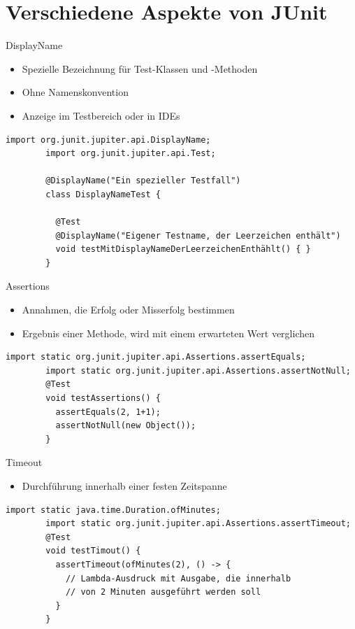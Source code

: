 \documentclass[utf8,t,aspectratio=169]{beamer}
\begin{document}
  \section{Verschiedene Aspekte von JUnit}
    \begin{frame}[fragile]{DisplayName}
      \begin{itemize}
        \item Spezielle Bezeichnung für Test-Klassen und -Methoden
        \item Ohne Namenskonvention
        \item Anzeige im Testbereich oder in IDEs
      \end{itemize}
      \begin{lstlisting}[gobble=8]
        import org.junit.jupiter.api.DisplayName;
        import org.junit.jupiter.api.Test;

        @DisplayName("Ein spezieller Testfall")
        class DisplayNameTest {

          @Test
          @DisplayName("Eigener Testname, der Leerzeichen enthält")
          void testMitDisplayNameDerLeerzeichenEnthählt() { }
        }
      \end{lstlisting}
    \end{frame}
    \begin{frame}[fragile]{Assertions}
      \begin{itemize}
        \item Annahmen, die Erfolg oder Misserfolg bestimmen
          \item Ergebnis einer Methode, wird mit einem erwarteten Wert
            verglichen
      \end{itemize}
      \begin{lstlisting}[gobble=8]
        import static org.junit.jupiter.api.Assertions.assertEquals;
        import static org.junit.jupiter.api.Assertions.assertNotNull;
        @Test
        void testAssertions() {
          assertEquals(2, 1+1);
          assertNotNull(new Object());
        }
      \end{lstlisting}
    \end{frame}
    \begin{frame}[fragile]{Timeout}
      \begin{itemize}
        \item Durchführung innerhalb einer festen Zeitspanne
      \end{itemize}
      \begin{lstlisting}[gobble=8]
        import static java.time.Duration.ofMinutes;
        import static org.junit.jupiter.api.Assertions.assertTimeout;
        @Test
        void testTimout() {
          assertTimeout(ofMinutes(2), () -> {
            // Lambda-Ausdruck mit Ausgabe, die innerhalb
            // von 2 Minuten ausgeführt werden soll
          }
        }
      \end{lstlisting}
    \end{frame}
\end{document}
